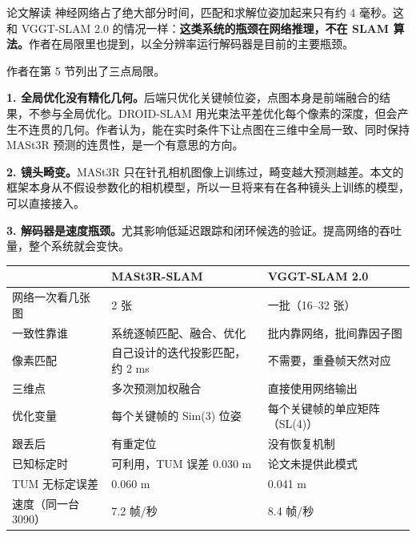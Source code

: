 \begin{interp}{论文解读}
神经网络占了绝大部分时间，匹配和求解位姿加起来只有约 4 毫秒。这和 VGGT-SLAM 2.0 的情况一样：\textbf{这类系统的瓶颈在网络推理，不在 SLAM 算法。}作者在局限里也提到，以全分辨率运行解码器是目前的主要瓶颈。


作者在第 5 节列出了三点局限。

\textbf{1. 全局优化没有精化几何。}后端只优化关键帧位姿，点图本身是前端融合的结果，不参与全局优化。DROID-SLAM 用光束法平差优化每个像素的深度，但会产生不连贯的几何。作者认为，能在实时条件下让点图在三维中全局一致、同时保持 MASt3R 预测的连贯性，是一个有意思的方向。

\textbf{2. 镜头畸变。}MASt3R 只在针孔相机图像上训练过，畸变越大预测越差。本文的框架本身从不假设参数化的相机模型，所以一旦将来有在各种镜头上训练的模型，可以直接接入。

\textbf{3. 解码器是速度瓶颈。}尤其影响低延迟跟踪和闭环候选的验证。提高网络的吞吐量，整个系统就会变快。



\begin{center}
\small
\begin{tabular}{p{3.0cm}p{6.0cm}p{6.0cm}}
\toprule
 & MASt3R-SLAM & VGGT-SLAM 2.0\\
\midrule
网络一次看几张图 & 2 张 & 一批（16--32 张）\\
一致性靠谁 & 系统逐帧匹配、融合、优化 & 批内靠网络，批间靠因子图\\
像素匹配 & 自己设计的迭代投影匹配，约 2 ms & 不需要，重叠帧天然对应\\
三维点 & 多次预测加权融合 & 直接使用网络输出\\
优化变量 & 每个关键帧的 Sim(3) 位姿 & 每个关键帧的单应矩阵（SL(4)）\\
跟丢后 & 有重定位 & 没有恢复机制\\
已知标定时 & 可利用，TUM 误差 0.030 m & 论文未提供此模式\\
TUM 无标定误差 & 0.060 m & 0.041 m\\
速度（同一台 3090） & 7.2 帧/秒 & 8.4 帧/秒\\
\bottomrule
\end{tabular}
\end{center}


\end{interp}

